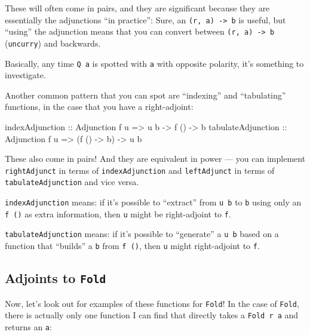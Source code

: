 \documentclass[]{article}
\newenvironment{Shaded}{}{}
\newcommand{\DataTypeTok}[1]{\textcolor[rgb]{0.56,0.13,0.00}{#1}}
\newcommand{\NormalTok}[1]{#1}
\newcommand{\OtherTok}[1]{\textcolor[rgb]{0.00,0.44,0.13}{#1}}
\begin{document}
These will often come in pairs, and they are significant because they are
essentially the adjunctions ``in practice'': Sure, an
\texttt{(r,\ a)\ -\textgreater{}\ b} is useful, but ``using'' the adjunction
means that you can convert between \texttt{(r,\ a)\ -\textgreater{}\ b}
(\texttt{uncurry}) and backwards.

Basically, any time \texttt{Q\ a} is spotted with \texttt{a} with opposite
polarity, it's something to investigate.

Another common pattern that you can spot are ``indexing'' and ``tabulating''
functions, in the case that you have a right-adjoint:

\begin{Shaded}
\begin{Highlighting}[]
\OtherTok{indexAdjunction    ::} \DataTypeTok{Adjunction}\NormalTok{ f u }\OtherTok{=>}\NormalTok{ u b }\OtherTok{{-}>}\NormalTok{ f () }\OtherTok{{-}>}\NormalTok{ b}
\OtherTok{tabulateAdjunction ::} \DataTypeTok{Adjunction}\NormalTok{ f u }\OtherTok{=>}\NormalTok{ (f () }\OtherTok{{-}>}\NormalTok{ b) }\OtherTok{{-}>}\NormalTok{ u b}
\end{Highlighting}
\end{Shaded}

These also come in pairs! And they are equivalent in power --- you can implement
\texttt{rightAdjunct} in terms of \texttt{indexAdjunction} and
\texttt{leftAdjunct} in terms of \texttt{tabulateAdjunction} and vice versa.

\texttt{indexAdjunction} means: if it's possible to ``extract'' from
\texttt{u\ b} to \texttt{b} using only an \texttt{f\ ()} as extra information,
then \texttt{u} might be right-adjoint to \texttt{f}.

\texttt{tabulateAdjunction} means: if it's possible to ``generate'' a
\texttt{u\ b} based on a function that ``builds'' a \texttt{b} from
\texttt{f\ ()}, then \texttt{u} might right-adjoint to \texttt{f}.

\hypertarget{adjoints-to-fold}{%
\subsection{\texorpdfstring{Adjoints to
\texttt{Fold}}{Adjoints to Fold}}\label{adjoints-to-fold}}

Now, let's look out for examples of these functions for \texttt{Fold}! In the
case of \texttt{Fold}, there is actually only one function I can find that
directly takes a \texttt{Fold\ r\ a} and returns an \texttt{a}:
\end{document}

